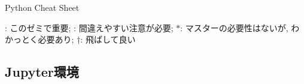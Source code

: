 \documentclass[landscape,7pt,dvipdfmx]{article}
\newcommand{\aka}[1]{{\color{red}{#1}}}
\newcommand{\ao}[1]{{\color{blue}{#1}}}
\begin{document}
\begin{center}
Python Cheat Sheet
\end{center}


\ao{青}: このゼミで重要; \aka{赤}: 間違えやすい注意が必要; $\ast$: マスターの必要性はないが, わかっとく必要あり; $\dagger$: 飛ばして良い

\begin{multicols*}{3}

\iffalse
\section{実行方法}
\subsection{対話}
\begin{lstlisting}
$ python
>>> 1 + 1
2
\end{lstlisting} %
\subsection{ファイルに書いて実行}
(hello.py に以下を書き)
\begin{lstlisting}
x = 1 + 1
print("hello")
\end{lstlisting}
\begin{lstlisting}
$ python hello.py
hello
$
\end{lstlisting} %
\subsection{ファイル実行$+$対話}
\begin{lstlisting}
$ python -i hello.py
hello
>>> x
2
\end{lstlisting} %
\subsection{Emacs内で実行}
\begin{itemize}
\item hello.pyファイルを編集しているバッファで，
  \aka{C-c C-z}
\item Pythonが別のバッファで開く
\item hello.pyファイルを編集しているバッファで，C-c C-c $\Rightarrow$ ファイルの中身を送り込む
\end{itemize}
\fi

\section{Jupyter環境}

\end{multicols*}
\end{document}
